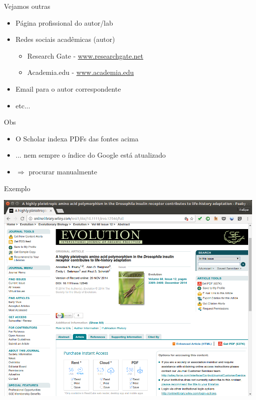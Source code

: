 \documentclass{beamer}
\begin{document}
\begin{frame}{Vejamos outras}
  \begin{itemize}
  \item Página profissional do autor/lab
  \item Redes sociais acadêmicas (autor)
    \begin{itemize}
    \item Research Gate - \url{www.researchgate.net}
    \item Academia.edu - \url{www.academia.edu}
    \end{itemize}
  \item Email para o autor correspondente
  \item etc...
  \end{itemize}
  \begin{block}{Obs}
    \begin{itemize}
    \item O Scholar indexa PDFs das fontes acima
    \item ... nem sempre o índice do Google está atualizado
    \item $\Rightarrow$ procurar manualmente
    \end{itemize}
  \end{block}
\end{frame}

\begin{frame}{Exemplo}
  \begin{center}
    \includegraphics[height=\textheight]{Busca/petrov1}
  \end{center}
\end{frame}
\end{document}
